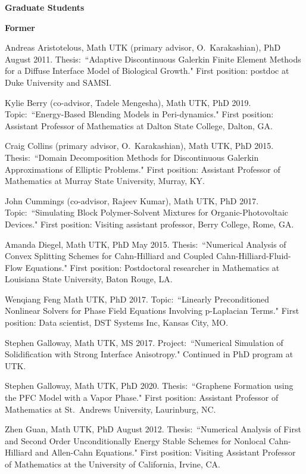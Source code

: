 \documentclass[11pt]{letter}
\begin{document}
    \smallskip

{\LARGE\bf  Graduate Students}
	\begin{description}
	\item
{\Large\bf Former}
	\begin{description}
	\item
Andreas Aristotelous, Math UTK (primary advisor, O.~Karakashian), PhD August 2011.  Thesis:~``Adaptive Discontinuous Galerkin Finite Element Methods for a Diffuse Interface Model of Biological Growth."  First position: postdoc at Duke University and SAMSI.
	\item
Kylie Berry (co-advisor, Tadele Mengesha), Math UTK, PhD 2019.  Topic:~``Energy-Based Blending Models in Peri-dynamics." First position: Assistant Professor of Mathematics at Dalton State College, Dalton, GA.
	\item
Craig Collins (primary advisor, O.~Karakashian), Math UTK, PhD 2015.  Thesis:~``Domain Decomposition Methods for Discontinuous Galerkin Approximations of Elliptic Problems." First position: Assistant Professor of Mathematics at Murray State University, Murray, KY.
	\item
John Cummings (co-advisor, Rajeev Kumar), Math UTK, PhD 2017.  Topic:~``Simulating Block Polymer-Solvent Mixtures for Organic-Photovoltaic Devices." First position: Visiting assistant professor, Berry College, Rome, GA.
	\item
Amanda Diegel, Math UTK, PhD May 2015.  Thesis:~``Numerical Analysis of Convex Splitting Schemes for Cahn-Hilliard and Coupled Cahn-Hilliard-Fluid-Flow Equations." First position: Postdoctoral researcher in Mathematics at  Louisiana State University, Baton Rouge, LA.
	\item
Wenqiang Feng  Math UTK, PhD 2017.  Topic:~``Linearly Preconditioned Nonlinear Solvers for Phase Field Equations Involving p-Laplacian Terms." First position: Data scientist, DST Systems Inc, Kansas City, MO. 
	\item
Stephen Galloway, Math UTK, MS 2017.  Project:~``Numerical Simulation of Solidification with Strong Interface Anisotropy." Continued in PhD program at UTK.
	\item
Stephen Galloway, Math UTK, PhD 2020.  Thesis:~``Graphene Formation using the PFC Model with a Vapor Phase." First position: Assistant Professor of Mathematics at St.~Andrews University, Laurinburg, NC.
	\item
Zhen Guan, Math UTK, PhD August 2012.  Thesis:~``Numerical Analysis of First and Second Order Unconditionally Energy Stable Schemes for Nonlocal Cahn-Hilliard and Allen-Cahn Equations." First position: Visiting Assistant Professor of Mathematics at the University of California, Irvine, CA.


\end{description}
\end{description}
\end{document}

